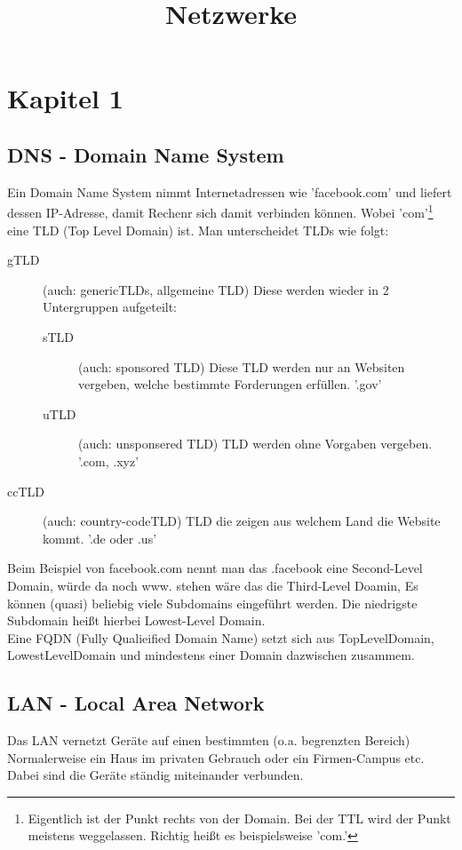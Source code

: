 \documentclass[a4paper,10pt]{scrartcl}
\title{Netzwerke}
\author{}
\date{}
\begin{document}
\maketitle
\newpage
\tableofcontents
\newpage
\section{Kapitel 1}
    \subsection{DNS - Domain Name System}
        Ein Domain Name System nimmt Internetadressen wie 'facebook.com' und liefert dessen IP-Adresse, 
        damit Rechenr sich damit verbinden können. Wobei 'com'\footnote[1]{Eigentlich ist der Punkt rechts von der Domain. Bei der TTL wird der Punkt meistens weggelassen. Richtig heißt es beispielsweise 'com.'} eine TLD (Top Level Domain) ist. Man unterscheidet TLDs wie folgt:
        \begin{description}
            \item [gTLD] (auch: genericTLDs, allgemeine TLD) Diese werden wieder in 2 Untergruppen aufgeteilt:
                \begin{description}
                    \item [sTLD] (auch: sponsored TLD) Diese TLD werden nur an Websiten vergeben, welche bestimmte Forderungen erfüllen. '.gov'
                    \item [uTLD] (auch: unsponsered TLD) TLD werden ohne Vorgaben vergeben. '.com, .xyz' 
                \end{description} 
            \item [ccTLD] (auch: country-codeTLD) TLD die zeigen aus welchem Land die Website kommt. '.de oder .us'
        \end{description}
        Beim Beispiel von facebook.com nennt man das .facebook eine Second-Level Domain, würde da noch www. stehen wäre das die Third-Level Doamin,
        Es können (quasi) beliebig viele Subdomains eingeführt werden. Die niedrigste Subdomain heißt hierbei Lowest-Level Domain. \\
        Eine FQDN (Fully Qualieified Domain Name) setzt sich aus TopLevelDomain, LowestLevelDomain und mindestens einer Domain dazwischen zusammem.
    \subsection{LAN - Local Area Network}
        Das LAN vernetzt Geräte auf einen bestimmten (o.a. begrenzten Bereich) Normalerweise ein Haus im privaten Gebrauch oder ein Firmen-Campus etc. Dabei sind die Geräte 
        ständig miteinander verbunden. 
\end{document}
